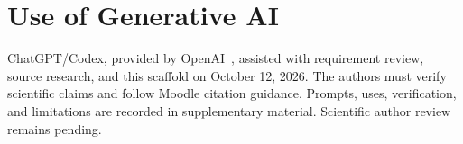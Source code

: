 \section*{Use of Generative AI}
ChatGPT/Codex, provided by OpenAI~\cite{openaiChatgpt}, assisted with requirement
review, source research, and this scaffold on October 12, 2026. The authors
must verify scientific claims and follow Moodle citation guidance. Prompts,
uses, verification, and limitations are recorded in supplementary material.
Scientific author review remains pending.
